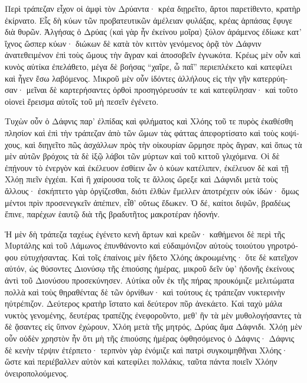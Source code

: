 \documentclass{book}
\begin{document}
\begin{pairs}
\begin{Leftside}
\begin{greek}
  Περὶ τράπεζαν εἶχον οἱ ἀμφὶ τὸν Δρύαντα· κρέα διῃρεῖτο, ἄρτοι παρετίθεντο, κρατὴρ ἐκίρνατο. Εἷς δὴ κύων τῶν προβατευτικῶν ἀμέλειαν φυλάξας,  κρέας ἁρπάσας ἔφυγε διὰ θυρῶν. Ἀλγήσας ὁ Δρύας (καὶ γὰρ ἦν ἐκείνου μοῖρα) ξύλον ἀράμενος ἐδίωκε κατ’ ἴχνος ὥσπερ κύων· διώκων δὲ κατὰ τὸν κιττὸν γενόμενος ὁρᾷ τὸν Δάφνιν ἀνατεθειμένον ἐπὶ τοὺς ὤμους τὴν ἄγραν καὶ ἀποσοβεῖν ἐγνωκότα.  Κρέως μὲν οὖν καὶ κυνὸς αὐτίκα ἐπελάθετο, μέγα δὲ βοήσας “χαῖρε, ὦ παῖ” περιεπλέκετο καὶ κατεφίλει καὶ ἦγεν ἔσω λαβόμενος. Μικροῦ μὲν οὖν ἰδόντες ἀλλήλους εἰς τὴν γῆν κατερρύησαν· μεῖναι δὲ καρτερήσαντες ὀρθοὶ προσηγόρευσάν τε καὶ κατεφίλησαν· καὶ τοῦτο οἱονεὶ ἔρεισμα αὐτοῖς τοῦ μὴ πεσεῖν ἐγένετο.
\pend


  Τυχὼν οὖν ὁ Δάφνις παρ’ ἐλπίδας καὶ φιλήματος καὶ Χλόης τοῦ τε πυρὸς ἐκαθέσθη πλησίον καὶ ἐπὶ τὴν τράπεζαν ἀπὸ τῶν ὤμων τὰς φάττας ἀπεφορτίσατο καὶ τοὺς κοψίχους, καὶ διηγεῖτο πῶς ἀσχάλλων πρὸς τὴν οἰκουρίαν ὥρμησε πρὸς ἄγραν, καὶ ὅπως τὰ μὲν αὐτῶν βρόχοις τὰ δὲ ἰξῷ λάβοι τῶν μύρτων καὶ τοῦ κιττοῦ γλιχόμενα.  Οἱ δὲ ἐπῄνουν τὸ ἐνεργὸν καὶ ἐκέλευον ἐσθίειν ὧν ὁ κύων κατέλιπεν, ἐκέλευον δὲ καὶ τῇ Χλόῃ πιεῖν ἐγχέαι. Καὶ ἣ χαίρουσα τοῖς τε ἄλλοις ὤρεξε καὶ Δάφνιδι μετὰ τοὺς ἄλλους· ἐσκήπτετο γὰρ ὀργίζεσθαι, διότι ἐλθὼν ἔμελλεν ἀποτρέχειν οὐκ ἰδών· ὅμως μέντοι πρὶν προσενεγκεῖν ἀπέπιεν, εἶθ’ οὕτως ἔδωκεν. Ὁ δέ, καίτοι διψῶν, βραδέως ἔπινε, παρέχων ἑαυτῷ διὰ τῆς βραδυτῆτος μακροτέραν ἡδονήν.
\pend


  Ἡ μὲν δὴ τράπεζα ταχέως ἐγένετο κενὴ ἄρτων καὶ κρεῶν· καθήμενοι δὲ περὶ τῆς Μυρτάλης καὶ τοῦ Λάμωνος ἐπυνθάνοντο καὶ εὐδαιμόνιζον αὐτοὺς τοιούτου γηροτρόφου εὐτυχήσαντας.  Καὶ τοῖς ἐπαίνοις μὲν ἥδετο Χλόης ἀκροωμένης· ὅτε δὲ κατεῖχον αὐτόν, ὡς θύσοντες Διονύσῳ τῆς ἐπιούσης ἡμέρας, μικροῦ δεῖν ὑφ’ ἡδονῆς ἐκείνους ἀντὶ τοῦ Διονύσου προσεκύνησεν.  Αὐτίκα οὖν ἐκ τῆς πήρας προυκόμιζε μελιτώματα πολλὰ καὶ τοὺς θηραθέντας δὲ τῶν ὀρνίθων· καὶ τούτους ἐς τράπεζαν νυκτερινὴν ηὐτρέπιζον. Δεύτερος κρατὴρ ἵστατο καὶ δεύτερον πῦρ ἀνεκάετο.  Καὶ ταχὺ μάλα νυκτὸς γενομένης, δευτέρας τραπέζης ἐνεφοροῦντο, μεθ’ ἣν τὰ μὲν μυθολογήσαντες τὰ δὲ ᾅσαντες εἰς ὕπνον ἐχώρουν, Χλόη μετὰ τῆς μητρός, Δρύας ἅμα Δάφνιδι.  Χλόῃ μὲν οὖν οὐδὲν χρηστὸν ἦν ὅτι μὴ τῆς ἐπιούσης ἡμέρας ὀφθησόμενος ὁ Δάφνις· Δάφνις δὲ κενὴν τέρψιν ἐτέρπετο· τερπνὸν γὰρ ἐνόμιζε καὶ πατρὶ συγκοιμηθῆναι Χλόης· ὥστε καὶ περιέβαλλεν αὐτὸν καὶ κατεφίλει πολλάκις, ταῦτα πάντα ποιεῖν Χλόην ὀνειροπολούμενος.
\pend



\end{greek}
\end{Leftside}
\end{pairs}
\end{document}
